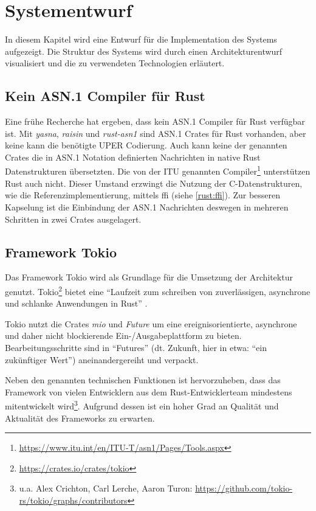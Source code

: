 
\chapter{Systementwurf}

In diesem Kapitel wird eine Entwurf für die Implementation des Systems aufgezeigt.
Die Struktur des Systems wird durch einen Architekturentwurf visualisiert und die zu verwendeten Technologien erläutert.

\section{Kein ASN.1 Compiler für Rust}

Eine frühe Recherche hat ergeben, dass kein ASN.1 Compiler für Rust verfügbar ist.
Mit \textit{yasna}, \textit{raisin} und \textit{rust-asn1} sind ASN.1 Crates für Rust vorhanden, aber keine kann die benötigte UPER Codierung.
Auch kann keine der genannten Crates die in ASN.1 Notation definierten Nachrichten in native Rust Datenstrukturen übersetzten.
Die von der ITU genannten Compiler\footnote{\url{https://www.itu.int/en/ITU-T/asn1/Pages/Tools.aspx}} unterstützen Rust auch nicht.
Dieser Umstand erzwingt die Nutzung der C-Datenstrukturen, wie die Referenzimplementierung, mittels \gls{ffi} (siehe \autoref{rust:ffi}).
Zur besseren Kapselung ist die Einbindung der ASN.1 Nachrichten deswegen in mehreren Schritten in zwei Crates ausgelagert.

\section{Framework Tokio}
\label{design:tokio}

Das Framework Tokio wird als Grundlage für die Umsetzung der Architektur genutzt.
Tokio\footnote{\url{https://crates.io/crates/tokio}} bietet eine \enquote{Laufzeit zum schreiben von zuverlässigen, asynchrone und schlanke Anwendungen in Rust} \cite{rust:crate:tokio}.

Tokio nutzt die Crates \textit{mio} und \textit{Future} um eine ereignisorientierte, asynchrone und daher nicht blockierende Ein-/Ausgabeplattform zu bieten.
Bearbeitungsschritte sind in \enquote{Futures} (dt. Zukunft, hier in etwa: \enquote{ein zukünftiger Wert}) aneinandergereiht und verpackt.

Neben den genannten technischen Funktionen ist hervorzuheben, dass das Framework von vielen Entwicklern aus dem Rust-Entwicklerteam mindestens mitentwickelt wird\footnote{u.a. Alex Crichton, Carl Lerche, Aaron Turon: \url{https://github.com/tokio-rs/tokio/graphs/contributors}}.
Aufgrund dessen ist ein hoher Grad an Qualität und Aktualität des Frameworks zu erwarten.

